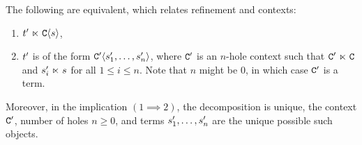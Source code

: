 \begin{lemma}
The following are equivalent, which relates refinement and contexts:
  \begin{enumerate}
  \item $t' \mathrel{\ltimes} \mathtt{C}\langle s\rangle$,
  \item $t'$ is of the form $\mathtt{C}'\langle s'_{1},\hdots,s'_n\rangle$,
        where $\mathtt{C}'$ is an $n$-hole context such that $\mathtt{C}' \mathrel{\ltimes} \mathtt{C}$ and
        $s'_i \mathrel{\ltimes} s$ for all $1 \leq i \leq n$.
        Note that $n$ might be $0$, in which case $\mathtt{C}'$ is a term.
  \end{enumerate}
Moreover, in the implication $(1 \implies 2)$,
the decomposition is unique,
\ie the context $\mathtt{C}'$, number of holes $n \geq 0$, and terms $s'_1,\hdots,s'_n$
are the unique possible such objects.
\end{lemma}

